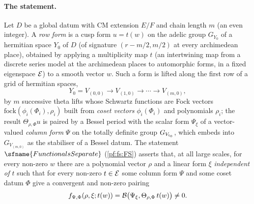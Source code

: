 \paragraph{The statement.}
Let $D$ be a global datum with CM extension $E/F$ and chain length $m$ (an even integer). A \emph{row form} is a cusp
form $u=t(w)$ on the adelic group $G_{Y_0}$ of a hermitian space $Y_0$ of $D$ (of signature $(r-m/2,m/2)$ at every
archimedean place), obtained by applying a multiplicity map $t$ (an intertwining map from a discrete series model at
the archimedean places to automorphic forms, in a fixed eigenspace $\mathcal E$) to a smooth vector $w$. Such a form is
lifted along the first row of a grid of hermitian spaces,
\[
Y_0=V_{(0,0)}\longrightarrow V_{(1,0)}\longrightarrow\cdots\longrightarrow V_{(m,0)},
\]
by $m$ successive theta lifts whose Schwartz functions are Fock vectors $\mathrm{fock}(\phi_i(\Phi_i),\rho_i)$ built from
\emph{coset vectors} $\phi_i(\Phi_i)$ and polynomials $\rho_i$; the result $\Theta_{\rho,\Phi}u$ is paired by a
Bessel period with the scalar form $\Psi_\xi$ of a vector-valued \emph{column form} $\Psi$ on the totally definite
group $G_{V_{\mathrm{t}_0}}$, which embeds into $G_{V_{(m,0)}}$ as the stabiliser of a Bessel datum. The statement
$\sfname{FunctionalsSeparate}$ (\cref{pf:fs:FS}) asserts that, at all large scales, for every non-zero $w$ there are a
polynomial vector $\rho$ and a linear form $\xi$ \emph{independent of $t$} such that for every non-zero $t\in\mathcal E$ some
column form $\Psi$ and some coset datum $\Phi$ give a convergent and non-zero pairing
\[
f_{\Psi,\Phi}(\rho,\xi;t(w))=\mathcal B\bigl(\Psi_\xi,\Theta_{\rho,\Phi}\,t(w)\bigr)\neq0 .
\]


